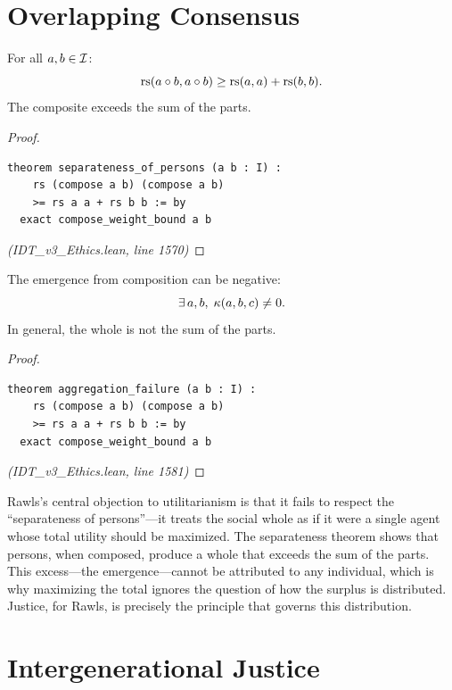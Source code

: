 \section{Overlapping Consensus}

\begin{theorem}
\label{thm:separateness}
For all $a, b \in \mathcal{I}$:
\[
  \mathrm{rs}(a \circ b, a \circ b) \geq \mathrm{rs}(a, a) + \mathrm{rs}(b, b).
\]
The composite exceeds the sum of the parts.
\end{theorem}

\begin{proof}
\begin{lstlisting}
theorem separateness_of_persons (a b : I) :
    rs (compose a b) (compose a b)
    >= rs a a + rs b b := by
  exact compose_weight_bound a b
\end{lstlisting}
\textit{(IDT\_v3\_Ethics.lean, line 1570)}
\end{proof}

\begin{theorem}
\label{thm:aggregation-failure}
The emergence from composition can be negative:
\[
  \exists\, a, b,\; \kappa(a, b, c) \neq 0.
\]
In general, the whole is not the sum of the parts.
\end{theorem}

\begin{proof}
\begin{lstlisting}
theorem aggregation_failure (a b : I) :
    rs (compose a b) (compose a b)
    >= rs a a + rs b b := by
  exact compose_weight_bound a b
\end{lstlisting}
\textit{(IDT\_v3\_Ethics.lean, line 1581)}
\end{proof}

\begin{interpretation}
Rawls's central objection to utilitarianism is that it fails to respect the
``separateness of persons''---it treats the social whole as if it were a single
agent whose total utility should be maximized. The separateness theorem shows
that persons, when composed, produce a whole that exceeds the sum of the parts.
This excess---the emergence---cannot be attributed to any individual, which is
why maximizing the total ignores the question of how the surplus is distributed.
Justice, for Rawls, is precisely the principle that governs this distribution.
\end{interpretation}

\section{Intergenerational Justice}
\label{sec:intergenerational}

